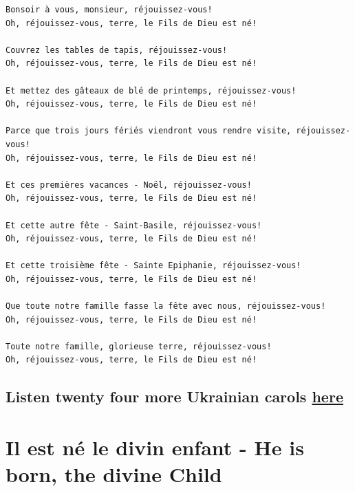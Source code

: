 \documentclass[
]{article}
\begin{document}
\begin{verbatim}
Bonsoir à vous, monsieur, réjouissez-vous!
Oh, réjouissez-vous, terre, le Fils de Dieu est né!

Couvrez les tables de tapis, réjouissez-vous!
Oh, réjouissez-vous, terre, le Fils de Dieu est né!

Et mettez des gâteaux de blé de printemps, réjouissez-vous!
Oh, réjouissez-vous, terre, le Fils de Dieu est né!

Parce que trois jours fériés viendront vous rendre visite, réjouissez-vous!
Oh, réjouissez-vous, terre, le Fils de Dieu est né!

Et ces premières vacances - Noël, réjouissez-vous!
Oh, réjouissez-vous, terre, le Fils de Dieu est né!

Et cette autre fête - Saint-Basile, réjouissez-vous!
Oh, réjouissez-vous, terre, le Fils de Dieu est né!

Et cette troisième fête - Sainte Epiphanie, réjouissez-vous!
Oh, réjouissez-vous, terre, le Fils de Dieu est né!

Que toute notre famille fasse la fête avec nous, réjouissez-vous!
Oh, réjouissez-vous, terre, le Fils de Dieu est né!

Toute notre famille, glorieuse terre, réjouissez-vous!
Oh, réjouissez-vous, terre, le Fils de Dieu est né!
\end{verbatim}

\hypertarget{listen-twenty-four-more-ukrainian-carols-here}{%
\subsection*{\texorpdfstring{Listen twenty four more Ukrainian carols
\href{https://soundcloud.com/user-755730179/sets/ukrainian-christmas-carols}{here}}{Listen twenty four more Ukrainian carols here}}\label{listen-twenty-four-more-ukrainian-carols-here}}

\hypertarget{il-est-nuxe9-le-divin-enfant---he-is-born-the-divine-child}{%
\section{Il est né le divin enfant - He is born, the divine
Child}\label{il-est-nuxe9-le-divin-enfant---he-is-born-the-divine-child}}

\hypertarget{section-21}{%
\subsection*{}\label{section-21}}
\end{document}
